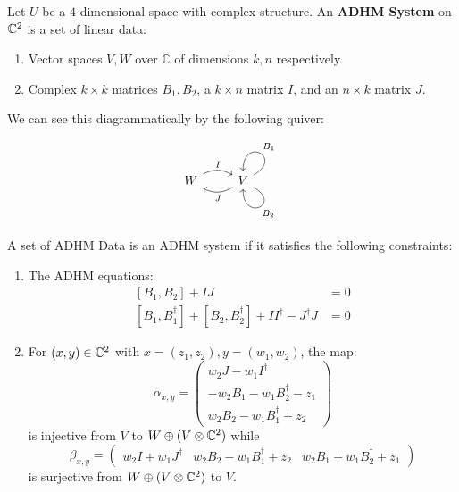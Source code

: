 	\begin{defn}
		Let $U$ be a $4$-dimensional space with complex structure. An \textbf{ADHM System} on $\mathbb{C}^2$ is a set of linear data:
		\begin{enumerate}
			\item Vector spaces $V,W$ over $\mathbb C$ of dimensions $k,n$ respectively.
			\item Complex $k \times k$ matrices $B_1, B_2$, a $k\times n$ matrix $I$, and an $n\times k$ matrix $J$.
		\end{enumerate}
		
		We can see this diagrammatically by the following quiver:
		\[
			\begin{tikzcd}
				W \arrow[r,bend left,"I"] & V \arrow[l,bend left,"J"] \arrow[out=30,in=90,loop,swap,"B_1"] \arrow[out=330,in=270,loop,"B_2"]
			\end{tikzcd}
		\]
		
		A set of ADHM Data is an ADHM system if it satisfies the following constraints:
		\begin{enumerate}
			\item The ADHM equations:
			\begin{equation}
				\begin{aligned}
					[B_1, B_2] + IJ&=0\\
					[B_1, B_1^\dagger] + [B_2, B_2^\dagger] + II^\dagger - J^\dagger J &= 0
				\end{aligned}
			\end{equation}
			\item For $(x,y) \in  \mathbb{C}^2$ with $x = (z_1, z_2), y = (w_1, w_2)$, the map:
			\begin{equation}
				\alpha_{x,y} = 
				\begin{pmatrix}
					w_2 J - w_1 I^\dagger \\
					-w_2 B_1 - w_1 B_2^\dagger - z_1 \\
					w_2 B_2 - w_1 B_1^\dagger + z_2
				\end{pmatrix}
			\end{equation}
			is injective from $V$ to $W \oplus (V\otimes \mathbb{C}^2)$ while
			\[
			\beta_{x,y} = \begin{pmatrix}
				w_2 I + w_1 J^\dagger & w_2 B_2 - w_1 B_1^\dagger + z_2 & w_2 B_1 + w_1 B_2^\dagger + z_1
			\end{pmatrix}	
			\]
			is surjective from $W \oplus (V \otimes \mathbb{C}^2)$ to $V$.
		\end{enumerate}
	\end{defn}
	
